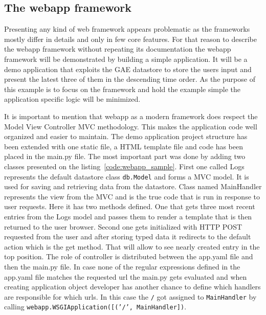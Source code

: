 \subsection{The webapp framework}\label{subsec:webapp}
Presenting any kind of web framework appears problematic as the frameworks mostly differ in details and only in few core features. For that reason to describe the webapp framework without repeating its documentation the webapp framework will be demonstrated by building a simple application. It will be a demo application that exploits the GAE datastore to store the users input and present the latest three of them in the descending time order. As the purpose of this example is to focus on the framework and hold the example simple the application specific logic will be minimized.

It is important to mention that webapp as a modern framework does respect the Model View Controller MVC methodology. This makes the application code well organized and easier to maintain. The demo application project structure has been extended with one static file, a HTML template file and  code has been placed in the main.py file. The most important part was done by adding two classes presented on the listing~\ref{code:webapp_sample}. First one called Logs represents the default datastore class \texttt{db.Model} and forms a MVC model. It is used for saving and retrieving data from the datastore. Class named MainHandler represents the view from the MVC and is the true code that is run in response to user requests. Here it  has two methods defined. One that gets three most recent entries from the Logs model and passes them to render a template that is then returned to the user browser. Second one gets initialized with HTTP POST requested from the user and after storing typed data it redirects to the default action which is the get method. That will allow to see nearly created entry in the top position. The role of controller is distributed between the app.yaml file and then the main.py file. In case none of the regular expressions defined in the app.yaml file matches the requested url the main.py gets evaluated and when creating application object developer has another chance to define which handlers are responsible for which urls. In this case the \texttt{/} got assigned to \texttt{MainHandler} by calling \texttt{webapp.WSGIApplication([('/', MainHandler])}.
 


